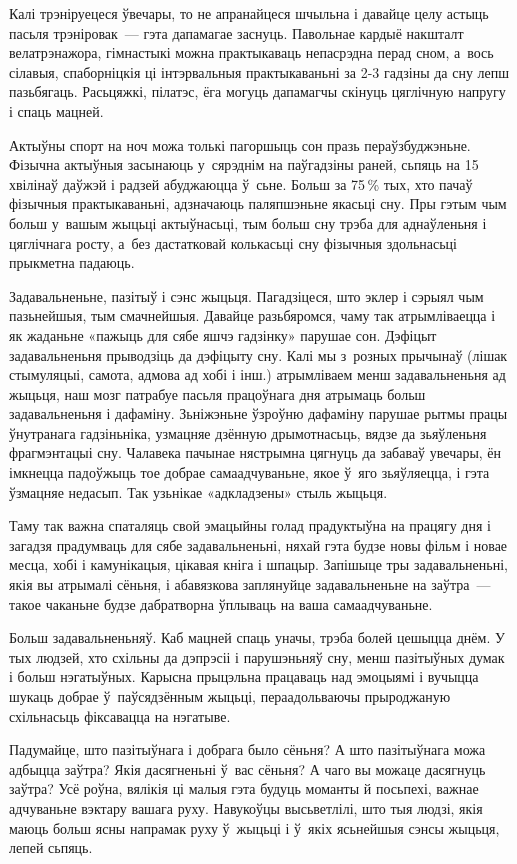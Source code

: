 Калі трэніруецеся ўвечары, то не апранайцеся шчыльна і давайце целу астыць пасьля трэніровак~--- гэта дапамагае заснуць. Павольнае кардыё накшталт велатрэнажора, гімнастыкі можна практыкаваць непасрэдна перад сном, а~вось сілавыя, спаборніцкія ці інтэрвальныя практыкаваньні за 2-3 гадзіны да сну лепш пазьбягаць. Расьцяжкі, пілатэс, ёга могуць дапамагчы скінуць цяглічную напругу і спаць мацней.

Актыўны спорт на ноч можа толькі пагоршыць сон празь пераўзбуджэньне. Фізычна актыўныя засынаюць у~сярэднім на паўгадзіны раней, сьпяць на 15 хвілінаў даўжэй і радзей абуджаюцца ў~сьне. Больш за 75\,\% тых, хто пачаў фізычныя практыкаваньні, адзначаюць паляпшэньне якасьці сну. Пры гэтым чым больш у~вашым жыцьці актыўнасьці, тым больш сну трэба для аднаўленьня і цяглічнага росту, а~без дастатковай колькасьці сну фізычныя здольнасьці прыкметна падаюць.

Задавальненьне, пазітыў і сэнс жыцьця. Пагадзіцеся, што эклер і сэрыял чым пазьнейшыя, тым смачнейшыя. Давайце разьбяромся, чаму так атрымліваецца і як жаданьне «пажыць для сябе яшчэ гадзінку» парушае сон. Дэфіцыт задавальненьня прыводзіць да дэфіцыту сну. Калі мы з~розных прычынаў (лішак стымуляцыі, самота, адмова ад хобі і інш.) атрымліваем менш задавальненьня ад жыцьця, наш мозг патрабуе пасьля працоўнага дня атрымаць больш задавальненьня і дафаміну. Зьніжэньне ўзроўню дафаміну парушае рытмы працы ўнутранага гадзіньніка, узмацняе дзённую дрымотнасьць, вядзе да зьяўленьня фрагмэнтацыі сну. Чалавека пачынае нястрымна цягнуць да забаваў увечары, ён імкнецца падоўжыць тое добрае самаадчуваньне, якое ў~яго зьяўляецца, і гэта ўзмацняе недасып. Так узьнікае «адкладзены» стыль жыцьця.

Таму так важна спаталяць свой эмацыйны голад прадуктыўна на працягу дня і загадзя прадумваць для сябе задавальненьні, няхай гэта будзе новы фільм і новае месца, хобі і камунікацыя, цікавая кніга і шпацыр. Запішыце тры задавальненьні, якія вы атрымалі сёньня, і абавязкова заплянуйце задавальненьне на заўтра~--- такое чаканьне будзе дабратворна ўплываць на ваша самаадчуваньне.

Больш задавальненьняў. Каб мацней спаць уначы, трэба болей цешыцца днём. У тых людзей, хто схільны да дэпрэсіі і парушэньняў сну, менш пазітыўных думак і больш нэгатыўных. Карысна прыцэльна працаваць над эмоцыямі і вучыцца шукаць добрае ў~паўсядзённым жыцьці, пераадольваючы прыроджаную схільнасьць фіксавацца на нэгатыве.

Падумайце, што пазітыўнага і добрага было сёньня? А што пазітыўнага можа адбыцца заўтра? Якія дасягненьні ў~вас сёньня? А чаго вы можаце дасягнуць заўтра? Усё роўна, вялікія ці малыя гэта будуць моманты й посьпехі, важнае адчуваньне вэктару вашага руху. Навукоўцы высьветлілі, што тыя людзі, якія маюць больш ясны напрамак руху ў~жыцьці і ў~якіх ясьнейшыя сэнсы жыцьця, лепей сьпяць.

